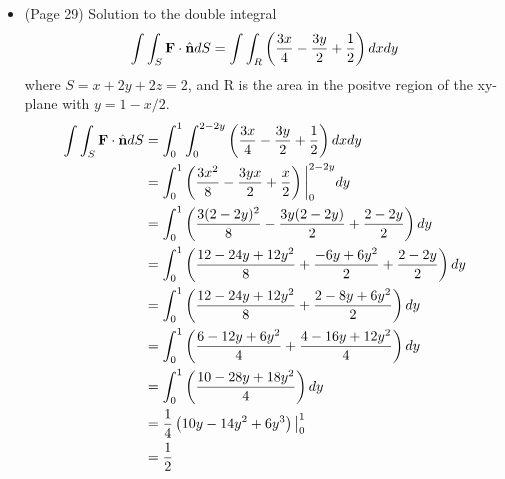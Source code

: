 \documentclass{article}
\begin{document}
\begin{itemize}
    \item (Page 29) Solution to the double integral
    \[ \int\int_S \textbf{F}\cdot\hat{\textbf{n}}dS = \int\int_R \left( \frac{3x}{4} - \frac{3y}{2} + \frac{1}{2} \right) dxdy \]
    where $S = x + 2y + 2z = 2$, and R is the area in the positve region of the xy-plane
    with $y = 1 - x/2$.
    \begin{align*}
        \int\int_S \textbf{F}\cdot\hat{\textbf{n}}dS &= \int_0^1\int_0^{2-2y} \left( \frac{3x}{4} - \frac{3y}{2} + \frac{1}{2} \right) dxdy \\
        &= \int_0^1\left( \frac{3x^2}{8} - \frac{3yx}{2} + \frac{x}{2} \right) \bigg|_0^{2-2y} dy \\
        &= \int_0^1\left( \frac{3(2-2y)^2}{8} - \frac{3y(2-2y)}{2} + \frac{2-2y}{2} \right) dy \\
        &= \int_0^1\left( \frac{12-24y+12y^2}{8} + \frac{-6y+6y^2}{2} + \frac{2-2y}{2} \right) dy \\
        &= \int_0^1\left( \frac{12-24y+12y^2}{8} + \frac{2-8y+6y^2}{2} \right) dy \\
        &= \int_0^1\left( \frac{6-12y+6y^2}{4} + \frac{4-16y+12y^2}{4} \right) dy \\
        &= \int_0^1\left( \frac{10-28y+18y^2}{4} \right) dy \\
        &= \frac{1}{4} \left( 10y-14y^2+6y^3 \right) \big|_0^1 \\
        &= \frac{1}{2} \\
    \end{align*}
\end{itemize}
\end{document}
